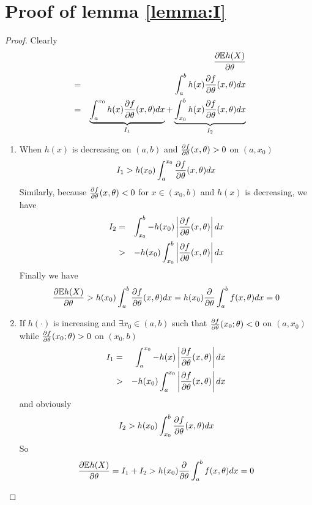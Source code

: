 \documentclass{article}
\begin{document}
\appendix
\section{Proof of lemma \ref{lemma:I}}
\begin{proof}
  Clearly
  \begin{eqnarray*}
    && \frac{\partial \mathbb{E} h(X)}{\partial \theta} \\
    &=& \int_a^b h(x) \frac{\partial f}{\partial \theta}(x, \theta) dx \\
    &=& \underbrace{\int_a^{x_0} h(x) \frac{\partial f}{\partial \theta}(x, \theta) dx}_{I_1}
    + \underbrace{\int_{x_0}^b h(x) \frac{\partial f}{\partial \theta}(x, \theta) dx}_{I_2}
  \end{eqnarray*}
  \begin{enumerate}
  \item When $h(x)$ is decreasing on $(a, b)$ and $\frac{\partial f}{\partial \theta}(x,
    \theta) > 0$ on $(a, x_0)$
    \[
    I_1 > h(x_0) \int_a^{x_0} \frac{\partial f}{\partial \theta}(x, \theta) dx
    \]
    Similarly, because $\frac{\partial f}{\partial \theta}(x, \theta) < 0$ for $x \in (x_0, b)$ and
    $h(x)$ is decreasing, we have
    \begin{eqnarray*}
      I_2 &=& \int_{x_0}^b -h(x_0)
      \left|\frac{\partial f}{\partial \theta}(x, \theta) \right| dx \\
      &>& -h(x_0)
      \int_{x_0}^b \left| 
        \frac{\partial f}{\partial \theta}(x, \theta)
      \right| dx
    \end{eqnarray*}
    Finally we have
    \begin{eqnarray*}
      \frac{\partial \mathbb{E} h(X)}{\partial \theta}
      > h(x_0) \int_a^b \frac{\partial f}{\partial \theta}(x, \theta) dx
      = h(x_0) \frac{\partial}{\partial \theta} \int_a^b f(x, \theta) dx
      = 0
    \end{eqnarray*}
  \item If $h(\cdot)$ is increasing and $\exists x_0 \in (a, b)$ such that 
    $\frac{\partial f}{\partial \theta}(x_0; \theta) < 0$ on $(a, x_0)$  while
    $\frac{\partial f}{\partial \theta}(x_0; \theta) > 0$ on $(x_0, b)$
    \begin{eqnarray*}
      I_1 &=&
      \int_a^{x_0} -h(x)
      \left| \frac{\partial f}{\partial \theta}(x, \theta) \right| dx \\
      &>&
      -h(x_0) \int_a^{x_0}
      \left| \frac{\partial f}{\partial \theta}(x, \theta) \right| dx
    \end{eqnarray*}
    and obviously
    \[
    I_2 > h(x_0) \int_{x_0}^b
    \frac{\partial f}{\partial \theta}(x, \theta) dx
    \]
    So
    \[
    \frac{\partial \mathbb{E} h(X)}{\partial \theta}
    = I_1 + I_2
    > h(x_0) \frac{\partial}{\partial \theta} \int_a^b f(x, \theta) dx = 0
    \]
  \end{enumerate}
\end{proof}
\end{document}
